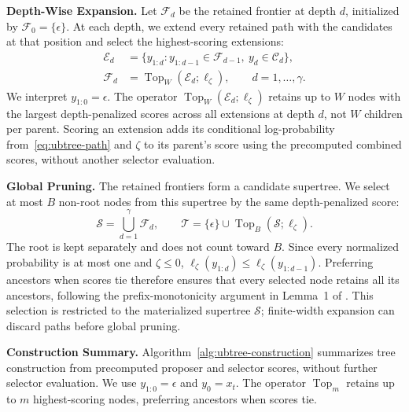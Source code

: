 \noindent\textbf{Depth-Wise Expansion.}
Let $\mathcal F_d$ be the retained frontier at depth $d$, initialized by $\mathcal F_0=\{\epsilon\}$. At each depth, we extend every retained path with the candidates at that position and select the highest-scoring extensions:
\begin{equation}
    \begin{aligned}
        \mathcal E_d
        &=\{y_{1:d}:y_{1:d-1}\in\mathcal F_{d-1},\ y_d\in\mathcal C_d\},\\
        \mathcal F_d
        &=\operatorname{Top}_{W}(\mathcal E_d;\ell_\zeta),
        \qquad d=1,\ldots,\gamma.
    \end{aligned}
    \label{eq:ubtree-frontier}
\end{equation}
We interpret $y_{1:0}=\epsilon$. The operator $\operatorname{Top}_{W}(\mathcal E_d;\ell_\zeta)$ retains up to $W$ nodes with the largest depth-penalized scores across all extensions at depth $d$, not $W$ children per parent. Scoring an extension adds its conditional log-probability from~\eqref{eq:ubtree-path} and $\zeta$ to its parent's score using the precomputed combined scores, without another selector evaluation.

\noindent\textbf{Global Pruning.}
The retained frontiers form a candidate supertree. We select at most $B$ non-root nodes from this supertree by the same depth-penalized score:
\begin{equation}
    \mathcal S=\bigcup_{d=1}^{\gamma}\mathcal F_d,
    \qquad
    \mathcal T=\{\epsilon\}\cup\operatorname{Top}_{B}(\mathcal S;\ell_\zeta).
    \label{eq:ubtree-pruning}
\end{equation}
The root is kept separately and does not count toward $B$. Since every normalized probability is at most one and $\zeta\le0$, $\ell_\zeta(y_{1:d})\le\ell_\zeta(y_{1:d-1})$. Preferring ancestors when scores tie therefore ensures that every selected node retains all its ancestors, following the prefix-monotonicity argument in Lemma~1 of \citet{li2026dartree}. This selection is restricted to the materialized supertree $\mathcal S$; finite-width expansion can discard paths before global pruning.

\noindent\textbf{Construction Summary.}
  Algorithm~\ref{alg:ubtree-construction} summarizes tree construction
  from precomputed proposer and selector scores, without further
  selector evaluation. We use $y_{1:0}=\epsilon$ and $y_0=x_t$.
  The operator $\operatorname{Top}_m$ retains up to $m$
  highest-scoring nodes, preferring ancestors when scores tie.

